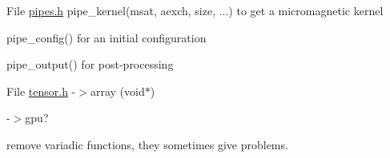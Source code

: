 \label{todo__todo000023}
\hypertarget{todo__todo000023}{}
 
\begin{DoxyDescription}
\item[File \hyperlink{pipes_8h}{pipes.h} ]pipe\_\-kernel(msat, aexch, size, ...) to get a micromagnetic kernel 

pipe\_\-config() for an initial configuration 

pipe\_\-output() for post-\/processing


\end{DoxyDescription}

\label{todo__todo000024}
\hypertarget{todo__todo000024}{}
 
\begin{DoxyDescription}
\item[File \hyperlink{tensor_8h}{tensor.h} ]-\/$>$array (void$\ast$) 

-\/$>$gpu? 

remove variadic functions, they sometimes give problems.


\end{DoxyDescription}